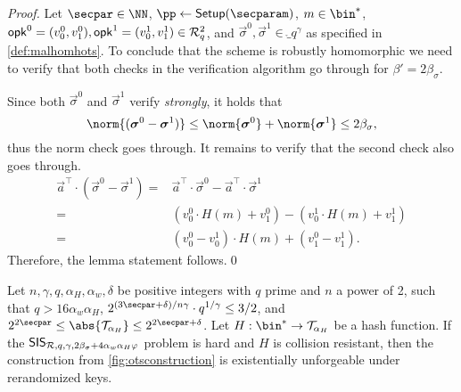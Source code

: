 \begin{proof}
  Let $\secpar\in\NN$, $\pp\gets\setup(\secparam)$, $m\in\bin^*$, $\mathsf{opk}^0=(v^0_0,v^0_1),\mathsf{opk}^1=(v^1_0,v^1_1)\in \mathcal{R}^2_q$, and $\vec{\sigma}^0,\vec{\sigma}^1 \in \ring_q^\gamma$ as specified in \autoref{def:malhomhots}.
  To conclude that the scheme is robustly homomorphic we need to verify that both checks in the verification algorithm go through for $\beta'=2\beta_\sigma$.
  
  Since both $\vec{\sigma}^0$ and $\vec{\sigma}^1$ verify \emph{strongly}, it holds that
  \begin{equation*}
     \norm{(\vec{\sigma}^0-\vec{\sigma}^1)}
    \leq \norm{\vec{\sigma}^0}+\norm{\vec{\sigma}^1}
    \leq 2\beta_\sigma,
  \end{equation*}
  thus the norm check goes through.
  It remains to verify that the second check also goes through.
  \begin{align*}
     \vec{a}^\intercal\cdot (\vec{\sigma}^0-\vec{\sigma}^1)
    =& \vec{a}^\intercal\cdot \vec{\sigma}^0- \vec{a}^\intercal\cdot\vec{\sigma}^1\\
    =& (v^0_0\cdot H(m) + v^0_1) - (v^1_0\cdot H(m) + v^1_1)\tag{Def of $\sverify$}\\
    =& (v^0_0-v^1_0)\cdot H(m) + (v^0_1-v^1_1).
  \end{align*}
  Therefore, the lemma statement follows.\qed
\end{proof}


\begin{lemma}\label{lem:kots_sis}
  Let $n,\gamma,q,\alpha_H,\alpha_w,\delta$ be positive integers with $q$ prime and $n$ a power of 2, such that $q > 16 \alpha_w \alpha_H$, $2^{(3\secpar+\delta)/n\gamma} \cdot q^{1/\gamma} \leq 3/2$, and $2^{2\secpar} \leq \abs{\tern_{\alpha_H}} \leq 2^{2\secpar + \delta}$.
  Let $H : \bin^* \to \tern_{\alpha_H}$ be a hash function.
  If the $\mathsf{SIS}_{\mathcal{R},q,\gamma,2\beta_\sigma + 4\alpha_w\alpha_H\varphi}$ problem is hard and $H$ is collision resistant, then the construction from \autoref{fig:otsconstruction} is existentially unforgeable under rerandomized keys.
\end{lemma}

